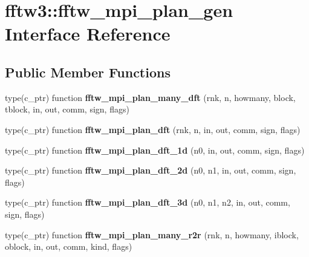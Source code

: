 \hypertarget{interfacefftw3_1_1fftw__mpi__plan__gen}{}\section{fftw3\+:\+:fftw\+\_\+mpi\+\_\+plan\+\_\+gen Interface Reference}
\label{interfacefftw3_1_1fftw__mpi__plan__gen}
\subsection*{Public Member Functions}
\begin{DoxyCompactItemize}
\item 
type(c\+\_\+ptr) function {\bfseries fftw\+\_\+mpi\+\_\+plan\+\_\+many\+\_\+dft} (rnk, n, howmany, block, tblock, in, out, comm, sign, flags)\hypertarget{interfacefftw3_1_1fftw__mpi__plan__gen_aeb613ea3fbd500c113b77a7eee483e76}{}\label{interfacefftw3_1_1fftw__mpi__plan__gen_aeb613ea3fbd500c113b77a7eee483e76}

\item 
type(c\+\_\+ptr) function {\bfseries fftw\+\_\+mpi\+\_\+plan\+\_\+dft} (rnk, n, in, out, comm, sign, flags)\hypertarget{interfacefftw3_1_1fftw__mpi__plan__gen_a6c4ce52aea7bd16b7e58433187a4377f}{}\label{interfacefftw3_1_1fftw__mpi__plan__gen_a6c4ce52aea7bd16b7e58433187a4377f}

\item 
type(c\+\_\+ptr) function {\bfseries fftw\+\_\+mpi\+\_\+plan\+\_\+dft\+\_\+1d} (n0, in, out, comm, sign, flags)\hypertarget{interfacefftw3_1_1fftw__mpi__plan__gen_a800e0ead1a1d89e261ab0df194ef788f}{}\label{interfacefftw3_1_1fftw__mpi__plan__gen_a800e0ead1a1d89e261ab0df194ef788f}

\item 
type(c\+\_\+ptr) function {\bfseries fftw\+\_\+mpi\+\_\+plan\+\_\+dft\+\_\+2d} (n0, n1, in, out, comm, sign, flags)\hypertarget{interfacefftw3_1_1fftw__mpi__plan__gen_a755b098041c13133cab6e37e9e3fa381}{}\label{interfacefftw3_1_1fftw__mpi__plan__gen_a755b098041c13133cab6e37e9e3fa381}

\item 
type(c\+\_\+ptr) function {\bfseries fftw\+\_\+mpi\+\_\+plan\+\_\+dft\+\_\+3d} (n0, n1, n2, in, out, comm, sign, flags)\hypertarget{interfacefftw3_1_1fftw__mpi__plan__gen_a64fb8385d52120bdf3c01458083f67eb}{}\label{interfacefftw3_1_1fftw__mpi__plan__gen_a64fb8385d52120bdf3c01458083f67eb}

\item 
type(c\+\_\+ptr) function {\bfseries fftw\+\_\+mpi\+\_\+plan\+\_\+many\+\_\+r2r} (rnk, n, howmany, iblock, oblock, in, out, comm, kind, flags)\hypertarget{interfacefftw3_1_1fftw__mpi__plan__gen_a002b5ba0d3e6b16166877acbdf4fcff4}{}\label{interfacefftw3_1_1fftw__mpi__plan__gen_a002b5ba0d3e6b16166877acbdf4fcff4}


\end{DoxyCompactItemize}
